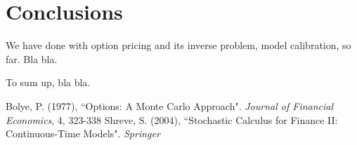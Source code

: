 \documentclass[12pt]{article}  %
\numberwithin{equation}{subsection}
\theoremstyle{plain}
\begin{document}
\section{Conclusions}
We have done with option pricing and its inverse problem, model calibration, so far. Bla bla.

To sum up, bla bla.
\newpage

\begin{thebibliography}{99}  %
Bolye, P. (1977), ``Options: A Monte Carlo Approach". \emph{Journal of Financial Economics}, 4, 323-338
Shreve, S. (2004), ``Stochastic Calculus for Finance II: Continuous-Time Models". \emph{Springer}
\end{thebibliography}
\newpage

\appendix

\end{document}
